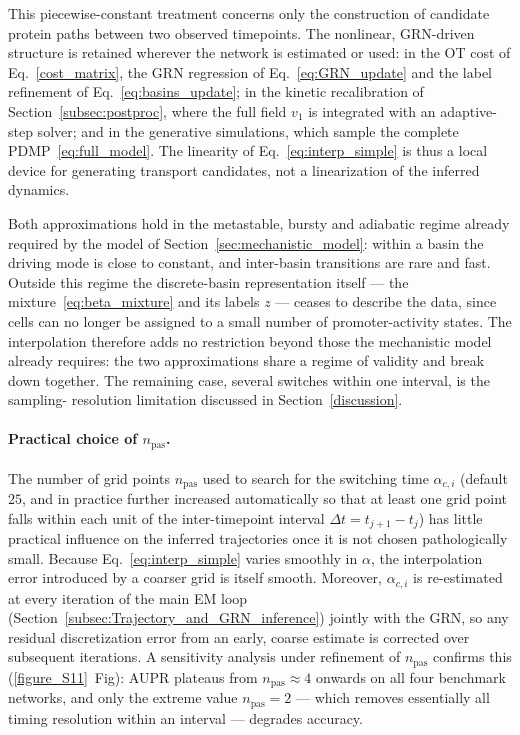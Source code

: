 \documentclass[a4paper, 11pt]{article}
\theoremstyle{plain}
\theoremstyle{remark}
\newcommand*{\firstreview}[1]{{\color{black}#1}}
\begin{document}
\begin{appendices}
\firstreview{This piecewise-constant treatment concerns only the construction of candidate
protein paths between two observed timepoints. The nonlinear, GRN-driven structure is retained
wherever the network is estimated or used: in the OT cost of Eq.~\eqref{cost_matrix}, the GRN
regression of Eq.~\eqref{eq:GRN_update} and the label refinement of
Eq.~\eqref{eq:basins_update}; in the kinetic recalibration of Section~\ref{subsec:postproc},
where the full field $v_1$ is integrated with an adaptive-step solver; and in the generative
simulations, which sample the complete PDMP~\eqref{eq:full_model}. The linearity of
Eq.~\eqref{eq:interp_simple} is thus a local device for generating transport candidates, not a
linearization of the inferred dynamics.}

\firstreview{Both approximations hold in the metastable, bursty and adiabatic regime already
required by the model of Section~\ref{sec:mechanistic_model}: within a basin the driving mode is
close to constant, and inter-basin transitions are rare and fast. Outside this regime the
discrete-basin representation itself --- the mixture~\eqref{eq:beta_mixture} and its labels $z$
--- ceases to describe the data, since cells can no longer be assigned to a small number of
promoter-activity states. The interpolation therefore adds no restriction beyond those the
mechanistic model already requires: the two approximations share a regime of validity and break
down together. The remaining case, several switches within one interval, is the sampling-
resolution limitation discussed in Section~\ref{discussion}.}

\paragraph{Practical choice of $n_{\mathrm{pas}}$.}
\firstreview{The number of grid points $n_{\mathrm{pas}}$ used to search for the switching
time $\alpha_{c,i}$ (default $25$, and in practice further increased automatically so that at
least one grid point falls within each unit of the inter-timepoint interval
$\Delta t = t_{j+1}-t_j$) has little practical influence on the inferred trajectories once it
is not chosen pathologically small. Because Eq.~\eqref{eq:interp_simple} varies smoothly
in $\alpha$, the interpolation error introduced by a coarser grid is itself
smooth. Moreover, $\alpha_{c,i}$ is
re-estimated at every iteration of the main EM loop
(Section~\ref{subsec:Trajectory_and_GRN_inference}) jointly with the GRN, so any residual
discretization error from an early, coarse estimate is corrected over subsequent iterations.
A sensitivity analysis under refinement of $n_{\mathrm{pas}}$ confirms this
(\ref{figure_S11}~Fig): AUPR plateaus from $n_{\mathrm{pas}} \approx 4$ onwards on all four
benchmark networks, and only the extreme value $n_{\mathrm{pas}} = 2$ — which removes
essentially all timing resolution within an interval — degrades accuracy.}



\end{appendices}
\end{document}
